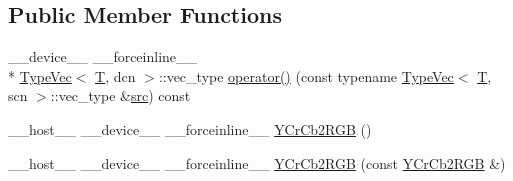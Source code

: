 \subsection*{Public Member Functions}
\begin{DoxyCompactItemize}
\item 
\-\_\-\-\_\-device\-\_\-\-\_\- \-\_\-\-\_\-forceinline\-\_\-\-\_\- \\*
\hyperlink{structcv_1_1gpu_1_1device_1_1TypeVec}{Type\-Vec}$<$ \hyperlink{calib3d_8hpp_a3efb9551a871ddd0463079a808916717}{T}, dcn $>$\-::vec\-\_\-type \hyperlink{structcv_1_1gpu_1_1device_1_1color__detail_1_1YCrCb2RGB_afe9bb24abddd5d65f95dd4a6ae173c3f}{operator()} (const typename \hyperlink{structcv_1_1gpu_1_1device_1_1TypeVec}{Type\-Vec}$<$ \hyperlink{calib3d_8hpp_a3efb9551a871ddd0463079a808916717}{T}, scn $>$\-::vec\-\_\-type \&\hyperlink{legacy_8hpp_a371cd109b74033bc4366f584edd3dacc}{src}) const 
\item 
\-\_\-\-\_\-host\-\_\-\-\_\- \-\_\-\-\_\-device\-\_\-\-\_\- \-\_\-\-\_\-forceinline\-\_\-\-\_\- \hyperlink{structcv_1_1gpu_1_1device_1_1color__detail_1_1YCrCb2RGB_af81ea2e708fc66475dab2cef98e41371}{Y\-Cr\-Cb2\-R\-G\-B} ()
\item 
\-\_\-\-\_\-host\-\_\-\-\_\- \-\_\-\-\_\-device\-\_\-\-\_\- \-\_\-\-\_\-forceinline\-\_\-\-\_\- \hyperlink{structcv_1_1gpu_1_1device_1_1color__detail_1_1YCrCb2RGB_a091db2e5de797dab188e1377b85d4784}{Y\-Cr\-Cb2\-R\-G\-B} (const \hyperlink{structcv_1_1gpu_1_1device_1_1color__detail_1_1YCrCb2RGB}{Y\-Cr\-Cb2\-R\-G\-B} \&)
\end{DoxyCompactItemize}


